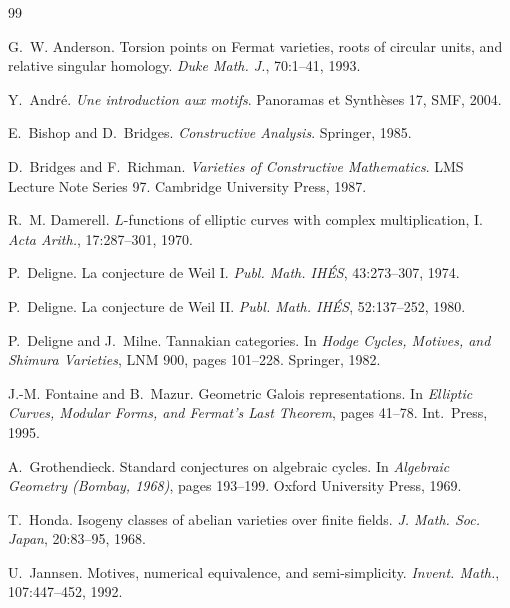 \documentclass[11pt]{article}
\theoremstyle{definition}
\theoremstyle{remark}
\begin{document}
\begin{thebibliography}{99}

G.~W. Anderson.
\newblock Torsion points on Fermat varieties, roots of circular units, and relative singular homology.
\newblock \emph{Duke Math. J.}, 70:1--41, 1993.

Y.~Andr\'e.
\newblock \emph{Une introduction aux motifs}.
\newblock Panoramas et Synth\`eses 17, SMF, 2004.

E.~Bishop and D.~Bridges.
\newblock \emph{Constructive Analysis}.
\newblock Springer, 1985.

D.~Bridges and F.~Richman.
\newblock \emph{Varieties of Constructive Mathematics}.
\newblock LMS Lecture Note Series 97. Cambridge University Press, 1987.

R.~M. Damerell.
\newblock $L$-functions of elliptic curves with complex multiplication, I.
\newblock \emph{Acta Arith.}, 17:287--301, 1970.

P.~Deligne.
\newblock La conjecture de Weil I.
\newblock \emph{Publ. Math. IH\'ES}, 43:273--307, 1974.

P.~Deligne.
\newblock La conjecture de Weil II.
\newblock \emph{Publ. Math. IH\'ES}, 52:137--252, 1980.

P.~Deligne and J.~Milne.
\newblock Tannakian categories.
\newblock In \emph{Hodge Cycles, Motives, and Shimura Varieties}, LNM 900, pages 101--228. Springer, 1982.

J.-M. Fontaine and B.~Mazur.
\newblock Geometric Galois representations.
\newblock In \emph{Elliptic Curves, Modular Forms, and Fermat's Last Theorem}, pages 41--78. Int.\ Press, 1995.

A.~Grothendieck.
\newblock Standard conjectures on algebraic cycles.
\newblock In \emph{Algebraic Geometry (Bombay, 1968)}, pages 193--199. Oxford University Press, 1969.

T.~Honda.
\newblock Isogeny classes of abelian varieties over finite fields.
\newblock \emph{J. Math. Soc. Japan}, 20:83--95, 1968.

U.~Jannsen.
\newblock Motives, numerical equivalence, and semi-simplicity.
\newblock \emph{Invent. Math.}, 107:447--452, 1992.


\end{thebibliography}
\end{document}
